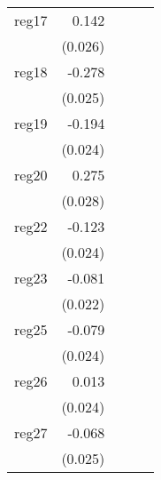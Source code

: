 {\begin{longtable}{l*{4}{D{.}{.}{-1}}}
\addlinespace
reg17       &       0.142\sym{***}&                     &                     &                     \\
            &     (0.026)         &                     &                     &                     \\
\addlinespace
reg18       &      -0.278\sym{***}&                     &                     &                     \\
            &     (0.025)         &                     &                     &                     \\
\addlinespace
reg19       &      -0.194\sym{***}&                     &                     &                     \\
            &     (0.024)         &                     &                     &                     \\
\addlinespace
reg20       &       0.275\sym{***}&                     &                     &                     \\
            &     (0.028)         &                     &                     &                     \\
\addlinespace
reg22       &      -0.123\sym{***}&                     &                     &                     \\
            &     (0.024)         &                     &                     &                     \\
\addlinespace
reg23       &      -0.081\sym{***}&                     &                     &                     \\
            &     (0.022)         &                     &                     &                     \\
\addlinespace
reg25       &      -0.079\sym{**} &                     &                     &                     \\
            &     (0.024)         &                     &                     &                     \\
\addlinespace
reg26       &       0.013         &                     &                     &                     \\
            &     (0.024)         &                     &                     &                     \\
\addlinespace
reg27       &      -0.068\sym{**} &                     &                     &                     \\
            &     (0.025)         &                     &                     &                     \\

\end{longtable}}
